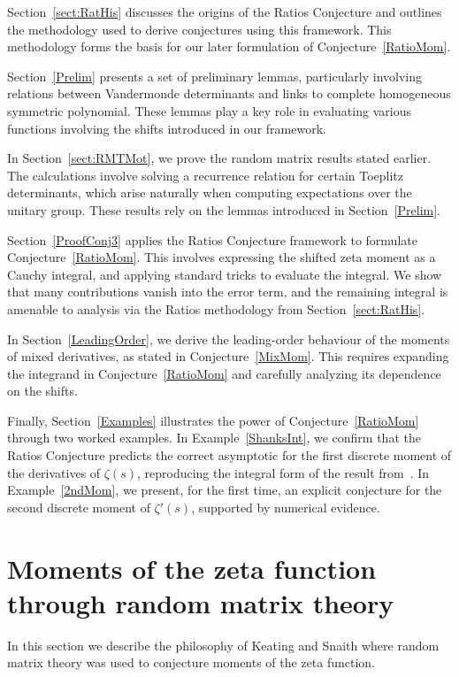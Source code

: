 \documentclass[12pt,a4paper,reqno]{amsart}
\theoremstyle{remark}
\numberwithin{equation}{section}
\begin{document}
Section~\ref{sect:RatHis} discusses the origins of the Ratios Conjecture and outlines the methodology used to derive conjectures using this framework. This methodology forms the basis for our later formulation of Conjecture~\ref{RatioMom}.

Section~\ref{Prelim} presents a set of preliminary lemmas, particularly involving relations between Vandermonde determinants and links to complete homogeneous symmetric polynomial. These lemmas play a key role in evaluating various functions involving the shifts introduced in our framework.

In Section~\ref{sect:RMTMot}, we prove the random matrix results stated earlier. The calculations involve solving a recurrence relation for certain Toeplitz determinants, which arise naturally when computing expectations over the unitary group. These results rely on the lemmas introduced in Section~\ref{Prelim}.

Section~\ref{ProofConj3} applies the Ratios Conjecture framework to formulate Conjecture~\ref{RatioMom}. This involves expressing the shifted zeta moment as a Cauchy integral, and applying standard tricks to evaluate the integral. We show that many contributions vanish into the error term, and the remaining integral is amenable to analysis via the Ratios methodology from Section~\ref{sect:RatHis}.

In Section~\ref{LeadingOrder}, we derive the leading-order behaviour of the moments of mixed derivatives, as stated in Conjecture~\ref{MixMom}. This requires expanding the integrand in Conjecture~\ref{RatioMom} and carefully analyzing its dependence on the shifts.

Finally, Section~\ref{Examples} illustrates the power of Conjecture~\ref{RatioMom} through two worked examples. In Example~\ref{ShanksInt}, we confirm that the Ratios Conjecture predicts the correct asymptotic for the first discrete moment of the derivatives of $\zeta(s)$, reproducing the integral form of the result from~\cite{HugPC22}. In Example~\ref{2ndMom}, we present, for the first time, an explicit conjecture for the second discrete moment of $\zeta'(s)$, supported by numerical evidence.


\section{Moments of the zeta function through random matrix theory}\label{sect:MomRMTHis}

In this section we describe the philosophy of Keating and Snaith \cite{KS00a} where random matrix theory was used to conjecture moments of the zeta function.
\end{document}
